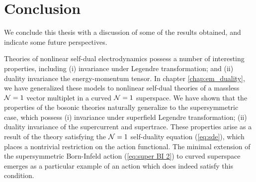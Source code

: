 \chapter*{Conclusion}


\setcounter{chapter}{6}
\setcounter{equation}{0}


We conclude this thesis with a discussion of some of the results obtained, and indicate some future perspectives. 

Theories of nonlinear self-dual electrodynamics possess a number of interesting properties, including (i) invariance under Legendre transformation; and (ii) duality invariance the energy-momentum tensor. In chapter \ref{chap:em_duality}, we have generalized these models to nonlinear self-dual theories of a massless ${\cal N}=1$ vector multiplet in a curved ${\cal N}=1$ superspace. We have shown that the properties of the bosonic theories naturally generalize to the supersymmetric case, which possess (i) invariance under superfield Legendre transformation; (ii) duality invariance of the supercurrent and supertrace. These properties arise as a result of the theory satisfying the \mbox{${\cal N}=1$} self-duality equation (\ref{eq:sde}), which places a nontrivial restriction on the action functional. The minimal extension of the supersymmetric Born-Infeld action (\ref{eq:super BI 2}) to curved superspace emerges as a particular example of an action which does indeed satisfy this condition. 

